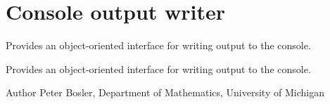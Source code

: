 \hypertarget{group__OutputWriter}{\section{Console output writer}
\label{group__OutputWriter}
}


Provides an object-\/oriented interface for writing output to the console.  


Provides an object-\/oriented interface for writing output to the console. 

\begin{DoxyAuthor}{Author}
Peter Bosler, Department of Mathematics, University of Michigan 
\end{DoxyAuthor}
